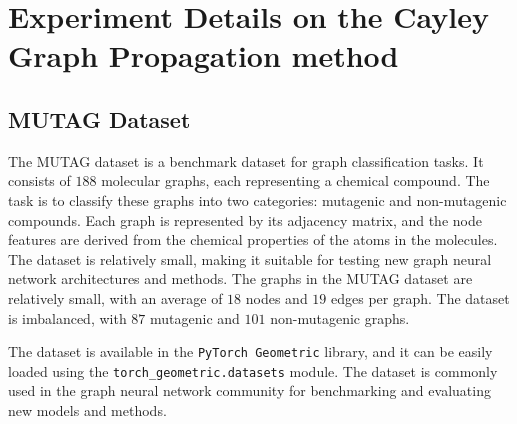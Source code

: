 \documentclass{article}
\theoremstyle{plain}
\theoremstyle{definition}
\theoremstyle{remark}
\begin{document}
\section{Experiment Details on the Cayley Graph Propagation method}
\label{app:mutag}
\subsection{MUTAG Dataset}
The MUTAG dataset \cite{doi:10.1021/jm00106a046} is a benchmark dataset for graph
 classification tasks. It consists of $188$ molecular graphs, each representing
  a chemical compound. The task is to classify these graphs into two categories: 
  mutagenic and non-mutagenic compounds. Each graph is represented by its adjacency 
  matrix, and the node features are derived from the chemical properties of the 
  atoms in the molecules.
The dataset is relatively small, making it suitable for testing new graph neural 
network architectures and methods. The graphs in the MUTAG dataset are relatively small, 
with an average of $18$ nodes and $19$ edges per graph. The dataset is imbalanced, 
with $87$ mutagenic and $101$ non-mutagenic graphs.

The dataset is available in the \texttt{PyTorch Geometric} library, and it can be easily 
loaded using the \texttt{torch\_geometric.datasets} module. The dataset is commonly 
used in the graph neural network community for benchmarking and evaluating new models and methods.
\end{document}
